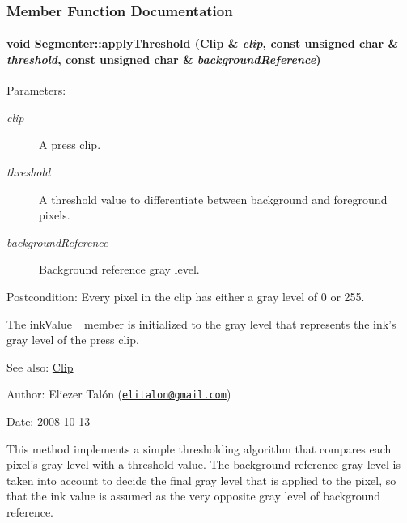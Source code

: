 \subsubsection{Member Function Documentation}
\hypertarget{class_segmenter_6854315e3320f9d9a8ece14cbb8570ee}{
\paragraph[{applyThreshold}]{\setlength{\rightskip}{0pt plus 5cm}void Segmenter::applyThreshold ({\bf Clip} \& {\em clip}, \/  const unsigned char \& {\em threshold}, \/  const unsigned char \& {\em backgroundReference})}\hfill}
\label{class_segmenter_6854315e3320f9d9a8ece14cbb8570ee}


\begin{Desc}
\item[Parameters:]
\begin{description}
\item[{\em clip}]A press clip. \item[{\em threshold}]A threshold value to differentiate between background and foreground pixels. \item[{\em backgroundReference}]Background reference gray level.\end{description}
\end{Desc}
\begin{Desc}
\item[Postcondition:]Every pixel in the clip has either a gray level of 0 or 255. 

The \hyperlink{class_segmenter_fa6183f99aa6011399783652b341a43b}{inkValue\_\-} member is initialized to the gray level that represents the ink's gray level of the press clip.\end{Desc}
\begin{Desc}
\item[See also:]\hyperlink{class_clip}{Clip}\end{Desc}
\begin{Desc}
\item[Author:]Eliezer Talón (\href{mailto:elitalon@gmail.com}{\tt elitalon@gmail.com}) \end{Desc}
\begin{Desc}
\item[Date:]2008-10-13\end{Desc}
This method implements a simple thresholding algorithm that compares each pixel's gray level with a threshold value. The background reference gray level is taken into account to decide the final gray level that is applied to the pixel, so that the ink value is assumed as the very opposite gray level of background reference. 

